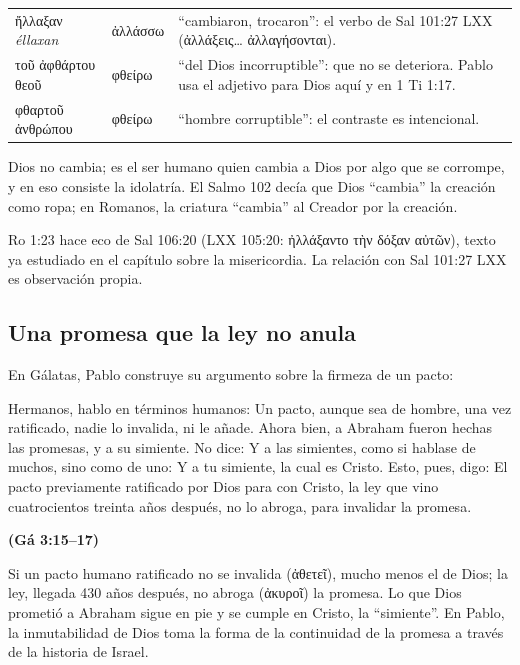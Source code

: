 \documentclass[11pt,letterpaper]{article}
\newcommand{\grc}[1]{\foreignlanguage{ancientgreek}{#1}}
\newcommand{\fuente}[1]{\par\hfill{\upshape\bfseries\small\textcolor{azul}{#1}}}
\begin{document}
\begin{filologia}[Ro 1:23]
\begin{tabular}{@{}L{3.2cm}L{1.6cm}L{10cm}@{}}
\grc{ἤλλαξαν} \emph{éllaxan} & \grc{ἀλλάσσω} & ``cambiaron, trocaron'': el verbo de Sal 101:27 LXX (\grc{ἀλλάξεις}\ldots{} \grc{ἀλλαγήσονται}). \\[2pt]
\grc{τοῦ ἀφθάρτου θεοῦ} & \grc{φθείρω} & ``del Dios incorruptible'': que no se deteriora. Pablo usa el adjetivo para Dios aquí y en 1 Ti 1:17. \\[2pt]
\grc{φθαρτοῦ ἀνθρώπου} & \grc{φθείρω} & ``hombre corruptible'': el contraste es intencional. \\
\end{tabular}
\end{filologia}

Dios no cambia; es el ser humano quien cambia a Dios por algo que se corrompe, y en eso consiste la idolatría. El Salmo 102 decía que Dios ``cambia'' la creación como ropa; en Romanos, la criatura ``cambia'' al Creador por la creación.

\begin{nota}[Precisión]
Ro 1:23 hace eco de Sal 106:20 (LXX 105:20: \grc{ἠλλάξαντο τὴν δόξαν αὐτῶν}), texto ya estudiado en el capítulo sobre la misericordia. La relación con Sal 101:27 LXX es observación propia.
\end{nota}

\subsection{Una promesa que la ley no anula}
En Gálatas, Pablo construye su argumento sobre la firmeza de un pacto:

\begin{cita}Hermanos, hablo en términos humanos: Un pacto, aunque sea de hombre, una vez ratificado, nadie lo invalida, ni le añade. Ahora bien, a Abraham fueron hechas las promesas, y a su simiente. No dice: Y a las simientes, como si hablase de muchos, sino como de uno: Y a tu simiente, la cual es Cristo. Esto, pues, digo: El pacto previamente ratificado por Dios para con Cristo, la ley que vino cuatrocientos treinta años después, no lo abroga, para invalidar la promesa.\fuente{(Gá 3:15--17)}\end{cita}

Si un pacto humano ratificado no se invalida (\grc{ἀθετεῖ}), mucho menos el de Dios; la ley, llegada 430 años después, no abroga (\grc{ἀκυροῖ}) la promesa. Lo que Dios prometió a Abraham sigue en pie y se cumple en Cristo, la ``simiente''. En Pablo, la inmutabilidad de Dios toma la forma de la continuidad de la promesa a través de la historia de Israel.
\end{document}
